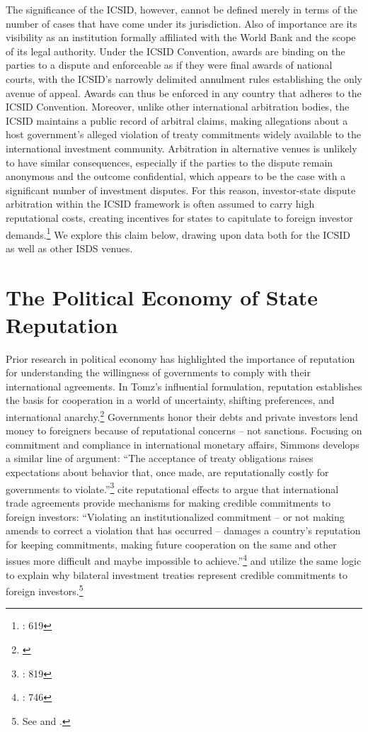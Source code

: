 \documentclass[12pt,onesided]{amsart}
\begin{document}
The significance of the ICSID, however, cannot be defined merely in terms of the number of cases that have come under its jurisdiction. Also of importance are its visibility as an institution formally affiliated with the World Bank and the scope of its legal authority. Under the ICSID Convention, awards are binding on the parties to a dispute and enforceable as if they were final awards of national courts, with the ICSID's narrowly delimited annulment rules establishing the only avenue of appeal. Awards can thus be enforced in any country that adheres to the ICSID Convention. Moreover, unlike other international arbitration bodies, the ICSID maintains a public record of arbitral claims, making allegations about a host government's alleged violation of treaty commitments widely available to the international investment community. Arbitration in alternative venues is unlikely to have similar consequences, especially if the parties to the dispute remain anonymous and the outcome confidential, which appears to be the case with a significant number of investment disputes. For this reason, investor-state dispute arbitration within the ICSID framework is often assumed to carry high reputational costs, creating incentives for states to capitulate to foreign investor demands.\footnote{\citet{trakman:2013}: 619}  We explore this claim below, drawing upon data both for the ICSID as well as other ISDS venues.

\section*{The Political Economy of State Reputation}

Prior research in political economy has highlighted the importance of reputation for understanding the willingness of governments to comply with their international agreements. In Tomz's influential formulation, reputation establishes the basis for cooperation in a world of uncertainty, shifting preferences, and international anarchy.\footnote{\citet{tomz:2007}} Governments honor their debts and private investors lend money to foreigners because of reputational concerns -- not sanctions. Focusing on commitment and compliance in international monetary affairs, Simmons develops a similar line of argument: ``The acceptance of treaty obligations raises expectations about behavior that, once made, are reputationally costly for governments to violate.''\footnote{\citet{simmons:2000}: 819} \citeauthor{buthe:milner:2008} cite reputational effects to argue that international trade agreements provide mechanisms for making credible commitments to foreign investors: ``Violating an institutionalized commitment -- or not making amends to correct a violation that has occurred -- damages a country's reputation for keeping commitments, making future cooperation on the same and other issues more difficult and maybe impossible to achieve.''\footnote{\citet{buthe:milner:2008}: 746}  \citeauthor{buthe:milner:2009} and \citeauthor{elkins:etal:2006} utilize the same logic to explain why bilateral investment treaties represent credible commitments to foreign investors.\footnote{See \citet{buthe:milner:2009} and \citet{elkins:etal:2006}.}
\end{document}
